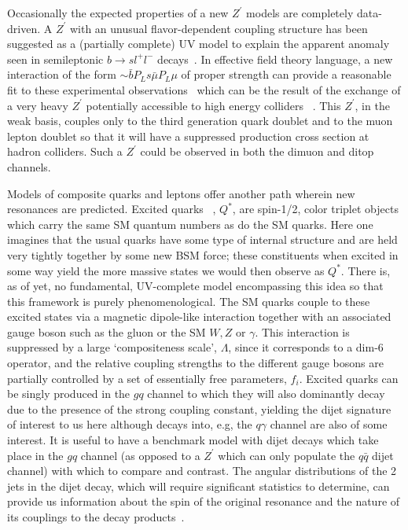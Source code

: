\documentclass[a4paper,11pt]{article}
\newcommand{\Zp}{\ensuremath{Z^{\prime}}}
\newcommand{\Z}{\ensuremath{Z}}
\begin{document}
Occasionally the expected properties of a new $\Zp$ models are completely data-driven.  A $\Zp$ with an unusual flavor-dependent coupling structure has been suggested as
a (partially complete) UV model to explain the apparent anomaly seen in semileptonic $b\rightarrow sl^+l^-$ decays~\cite{Aaij:2014ora,Aaij:2017vbb}. In effective field theory language,
a new interaction of the form $\sim \bar bP_Ls \bar \mu P_L \mu$ of proper strength can provide a reasonable fit to these experimental observations~\cite{Bifani:2018zmi} which can
be the result of the exchange of a
very heavy $\Zp$ potentially accessible to high energy colliders ~\cite{Allanach:2017bta}. This $\Zp$, in the weak basis, couples only to the third generation quark doublet and to the
muon lepton doublet so that it will have a suppressed production cross section at hadron colliders. Such a $\Zp$ could be observed in both the dimuon and ditop channels.

Models of composite quarks and leptons offer another path wherein new resonances are predicted. Excited quarks ~\cite{Baur:1987ga,Baur:1989kv}, $Q^*$, are spin-1/2, color triplet
objects which carry the same SM quantum numbers as do the SM quarks. Here one imagines that the usual quarks have some type of internal structure and are held very tightly together
by some new BSM force; these constituents when excited in some way yield the more massive states we would then observe as $Q^*$. There is, as of yet, no fundamental, UV-complete
model encompassing this idea so that this framework is purely phenomenological. The SM quarks couple to these excited states via a magnetic dipole-like interaction together with an associated gauge boson such as the gluon or the SM $W,\Z$ or $\gamma$.  This interaction is suppressed by a large `compositeness scale', $\Lambda$, since it corresponds to a dim-6 operator, and the relative coupling strengths to the different gauge bosons are partially controlled by a set of essentially free parameters, $f_i$. Excited quarks can be singly produced in
the $gq$ channel to which they will also dominantly decay due to the presence of the strong coupling constant, yielding the dijet signature of interest to us here although decays into, e.g,
the $q\gamma$ channel are also of some interest. It is useful to have a benchmark model with dijet decays which take place in the $gq$ channel (as opposed to a $\Zp$ which can
only populate the $q\bar q$ dijet channel) with which to compare and contrast. The angular distributions of the 2 jets in the dijet decay, which will require significant statistics to
determine, can provide
us information about the spin of the original resonance and the nature of its couplings to the decay products~\cite{Harris:2011bh,Boelaert:2009jm,Chivukula:2014pma,Chivukula:2017nvl}.
\end{document}
